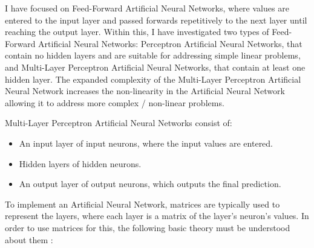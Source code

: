 \documentclass[./project-report/src/latex/project-report.tex]{subfiles}
\begin{document}
I have focused on Feed-Forward Artificial Neural Networks, where values are entered to the input layer and passed forwards repetitively to the next layer until 
reaching the output layer. Within this, I have investigated two types of Feed-Forward Artificial Neural Networks: Perceptron Artificial Neural Networks, that contain no 
hidden layers and are suitable for addressing simple linear problems, and Multi-Layer Perceptron Artificial Neural Networks, that contain at least one hidden layer. 
The expanded complexity of the Multi-Layer Perceptron Artificial Neural Network increases the non-linearity in the Artificial Neural Network allowing it to address 
more complex / non-linear problems.

\vspace{5mm}

\noindent
Multi-Layer Perceptron Artificial Neural Networks consist of:

\begin{itemize}
    \item An input layer of input neurons, where the input values are entered.
    \item Hidden layers of hidden neurons.
    \item An output layer of output neurons, which outputs the final prediction.
\end{itemize}

To implement an Artificial Neural Network, matrices are typically used to represent the layers, where each layer is a matrix of the layer's neuron's values. In order to use 
matrices for this, the following basic theory must be understood about them \cite{nelson2023essential}:
\end{document}
